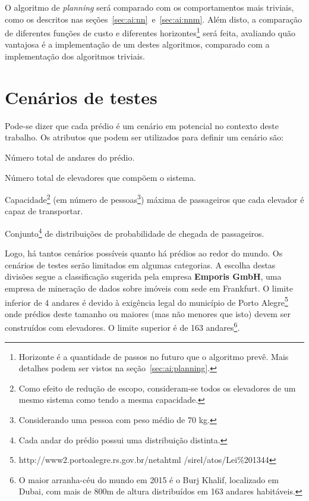 
O algoritmo de \textit{planning} será comparado com os comportamentos mais
triviais, como os descritos nas seções~\ref{sec:ai:nn}~e~\ref{sec:ai:nnm}. Além
disto, a comparação de diferentes funções de custo e diferentes
horizontes\footnote{Horizonte é a quantidade de passos no futuro que o algoritmo
prevê. Mais detalhes podem ser vistos na seção~\ref{sec:ai:planning}.} será
feita, avaliando quão vantajosa é a implementação de um destes algoritmos,
comparado com a implementação dos algoritmos triviais.

\section{\label{section:scenarios}Cenários de testes}

Pode-se dizer que cada prédio é um cenário em potencial no contexto deste
trabalho. Os atributos que podem ser utilizados para definir um cenário são:

\begin{description}[leftmargin=!,labelwidth=\widthof{\bfseries F}]
  \item[F]
  Número total de andares do prédio.
  \item[E]
  Número total de elevadores que compõem o sistema.
  \item[C]
  Capacidade\footnote{Como efeito de redução de escopo, consideram-se todos os
  elevadores de um mesmo sistema como tendo a mesma capacidade.} (em número de
  pessoas\footnote{Considerando uma pessoa com peso médio de 70 kg.}) máxima de
  passageiros que cada elevador é capaz de transportar.
  \item[D]
  Conjunto\footnote{Cada andar do prédio possui uma distribuição distinta.} de distribuições de probabilidade de chegada de passageiros.
\end{description}

Logo, há tantos cenários possíveis quanto há prédios ao redor do mundo. Os
cenários de testes serão limitados em algumas categorias. A escolha destas
divisões segue a classificação \cite{Emporis15} sugerida pela empresa
\textbf{Emporis GmbH}, uma empresa de mineração de dados sobre imóveis com sede
em Frankfurt. O limite inferior de 4 andares é devido à exigência legal do
município de Porto Alegre\footnote{http://www2.portoalegre.rs.gov.br/netahtml
/sirel/atos/Lei\%201344} onde prédios deste tamanho ou maiores (mas não menores
que isto) devem ser construídos com elevadores. O limite superior é de 163
andares\footnote{O maior arranha-céu do mundo em 2015 é o Burj Khalif,
localizado em Dubai, com mais de 800m de altura distribuídos em 163 andares
habitáveis.}.

